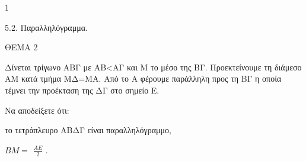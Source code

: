 \begin{ylh}{1}
    \item 5.2. Παραλληλόγραμμα.
\end{ylh}

ΘΕΜΑ 2

Δίνεται τρίγωνο ΑΒΓ με ΑΒ\textless ΑΓ και Μ το μέσο της ΒΓ. Προεκτείνουμε τη διάμεσο ΑΜ κατά τμήμα ΜΔ=ΜΑ. Από το Α φέρουμε παράλληλη προς τη ΒΓ η οποία τέμνει την προέκταση της ΔΓ στο σημείο Ε.

Να αποδείξετε ότι:

\begin{alist}
\item το τετράπλευρο ΑΒΔΓ είναι παραλληλόγραμμο, 

\item $ΒΜ =$ $\frac{ΑΕ}{2}$ . 
\end{alist}

